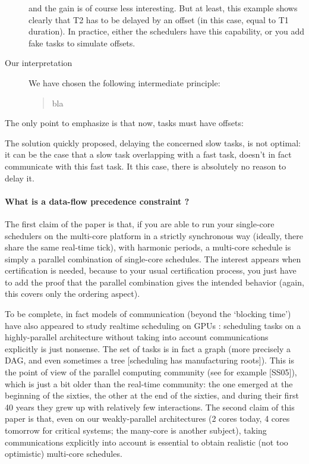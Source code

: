 \documentclass[a4paper]{article}
\begin{document}
\begin{description}
and the gain is of course less interesting.
But at least, this example shows clearly that T2 has to be delayed by an offset (in this case, equal to T1 duration).
In practice, either the schedulers have this capability, or you add fake tasks to simulate offsets.
\item[Our interpretation]
We have chosen the following intermediate principle:
\begin{quote}
bla
\end{quote}
 \end{description}

The only point to emphasize is that now,
tasks must have offsets: 

The solution quickly proposed, delaying the concerned slow tasks, is not optimal:
it can be the case that a slow task overlapping with a fast task, doesn't in fact communicate with this fast task.
It this case, there is absolutely no reason to delay it.




\paragraph*{What is a data-flow precedence constraint ?}

The first claim of the paper is that, if you are able to run your single-core schedulers on the multi-core platform
in a strictly synchronous way (ideally, there share the same real-time tick), with harmonic periods, a multi-core
schedule is simply a parallel combination of single-core schedules.  The
interest appears when certification is needed, because to your usual certification process, you just have to add the
proof that the parallel combination gives the intended behavior (again, this covers only the ordering aspect).





To be complete, in fact models of communication (beyond the ‘blocking time’) have also appeared to study realtime
scheduling on GPUs \cite{DBLP:conf/europar/CanonMSV18}: scheduling tasks on a highly-parallel architecture without taking into
account communications explicitly is just nonsense. The set of tasks is in fact a graph (more precisely a DAG,
and even sometimes a tree [scheduling has manufacturing roots]). This is the point of view of the parallel
computing community (see for example [SS05]), which is just a bit older than the real-time community: the one
emerged at the beginning of the sixties, the other at the end of the sixties, and during their first 40 years they
grew up with relatively few interactions. The second claim of this paper is that, even on our weakly-parallel
architectures (2 cores today, 4 cores tomorrow for critical systems; the many-core is another subject), taking
communications explicitly into account is essential to obtain realistic (not too optimistic) multi-core schedules.
\end{document}
